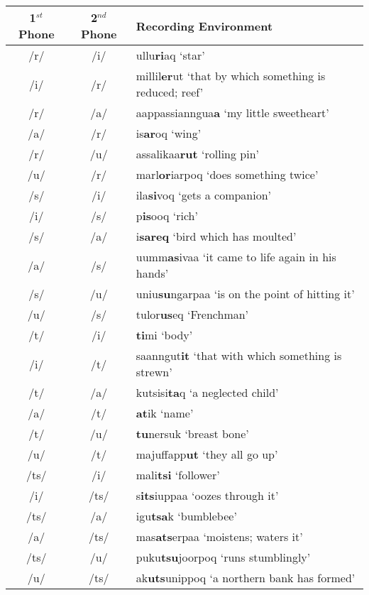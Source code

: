 \documentclass[12pt]{article}
\begin{document}
	\begin{tabular}{|c|c|l|}
	\hline
	1$^{st}$ Phone & 2$^{nd}$ Phone & Recording Environment \\
	\hline
	/r/ & /i/ & ullu\textbf{ri}aq `star' \\
	/i/ & /r/ & millil\textbf{er}ut `that by which something is reduced; reef'\\
	/r/ & /a/ & aappassianngua\textbf{a} `my little sweetheart'\\
	/a/ & /r/ & is\textbf{ar}oq `wing'\\
	/r/ & /u/ & assalikaa\textbf{rut} `rolling pin'\\
	/u/ & /r/ & marl\textbf{or}iarpoq `does something twice'\\
	/s/ & /i/ & ila\textbf{si}voq `gets a companion'\\
	/i/ & /s/ & p\textbf{is}ooq `rich'\\
	/s/ & /a/ & i\textbf{sareq} `bird which has moulted'\\
	/a/ & /s/ & uumm\textbf{as}ivaa `it came to life again in his hands'\\
	/s/ & /u/ & uniu\textbf{su}ngarpaa `is on the point of hitting it'\\
	/u/ & /s/ & tulor\textbf{us}eq `Frenchman'\\
	/t/ & /i/ & \textbf{ti}mi `body' \\
	/i/ & /t/ & saanngut\textbf{it} `that with which something is strewn'\\
	/t/ & /a/ & kutsisi\textbf{ta}q `a neglected child'\\
	/a/ & /t/ & \textbf{at}ik `name' \\
	/t/ & /u/ & \textbf{tu}nersuk `breast bone'\\
	/u/ & /t/ & majuffapp\textbf{ut} `they all go up'\\
	/ts/ & /i/ & mali\textbf{tsi} `follower'\\
	/i/ & /ts/ & s\textbf{its}iuppaa `oozes through it'\\
	/ts/ & /a/ & igu\textbf{tsa}k `bumblebee'\\
	/a/ & /ts/ & mas\textbf{ats}erpaa `moistens; waters it'\\
	/ts/ & /u/ & puku\textbf{tsu}joorpoq `runs stumblingly'\\
	/u/ & /ts/ & ak\textbf{uts}unippoq `a northern bank has formed'\\
	\hline
	\end{tabular}
	\newpage
\end{document}
